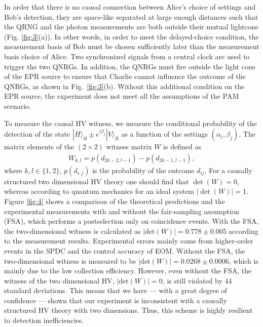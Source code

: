 \documentclass[aps,prl,twocolumn,amsmath,amssymb,nofootinbib,superscriptaddress]{revtex4-1}
\begin{document}


In order that there is no causal connection between Alice's choice of settings and Bob's detection, they are space-like separated at large enough distances such that the QRNG and the photon measurements are both outside their mutual lightcone (Fig. \ref{fig:3}(a)).  
In other words, in order to meet the delayed-choice condition, the measurement basis of Bob must be chosen sufficiently later than the measurement basis choice of Alice. Two synchronized signals from a central clock are used to trigger the two QNRGs. In addition, the QNRGs must fire outside the light cone of the EPR source to ensure that Charlie cannot influence the outcome of the QNRGs, as shown in Fig.~\ref{fig:3}(b). Without this additional condition on the EPR source, the experiment does not meet all the assumptions of the PAM scenario.




To measure the causal HV witness, we measure the conditional probability of the detection of the state $ |H{\rangle _B} \pm {e^{i{\beta_j}}}|V{\rangle _B} $ as a function of the settings $ ( \alpha_i, \beta_j ) $.  The matrix elements of the $(2 \times 2)$ witness matrix $W$ is defined as \cite{Bowles2014} 
%
\begin{align}
W_{k,l}= p(d_{2k-2,l-1}) - p(d_{2k-1,l-1}),
\end{align}
%
where $k,l \in \{ 1,2\} $, $ p(d_{i,j}) $ is the probability of the outcome $ d_{ij} $.  For a causally structured two dimensional HV theory one should find that $ \det (W) = 0 $, whereas according to quantum mechanics for an ideal system $ |\det (W)| = 1 $. Figure \ref{fig:4} shows a comparison of the theoretical predictions and  the experimental measurements with and without the fair-sampling assumption (FSA), which performs a postselection only on coincidence events. With the FSA, the two-dimensional witness is calculated as $|\text{det}({W})| = 0.778 \pm 0.005$ according to the measurement results. Experimental errors mainly come from higher-order events in the SPDC and the control accuracy of EOM.  Without the FSA, the two-dimensional witness is measured to be $|\text{det}({W})| = 0.0268 \pm 0.0006$, which is mainly due to the low collection efficiency. However, even without the FSA, the witness of the two dimensional HV,  $|\text{det}({W})| = 0$, is still violated by 44 standard deviations.   This means that we have --- with a great degree of confidence --- shown that our experiment is inconsistent with a causally structured HV theory with two dimensions. Thus, this scheme is highly resilient to detection inefficiencies.
\end{document}
